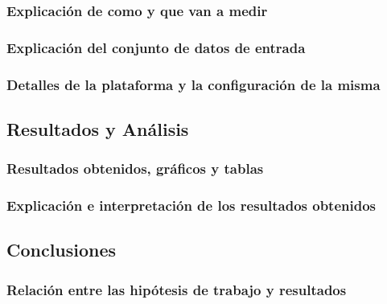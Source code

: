 \subsubsection*{Explicación de como y que van a medir}
\subsubsection*{Explicación del conjunto de datos de entrada}
\subsubsection*{Detalles de la plataforma y la configuración de la misma}

\subsection{Resultados y Análisis}
\subsubsection*{Resultados obtenidos, gráficos y tablas}
\subsubsection*{Explicación e interpretación de los resultados obtenidos}

\subsection{Conclusiones}
\subsubsection*{Relación entre las hipótesis de trabajo y resultados}